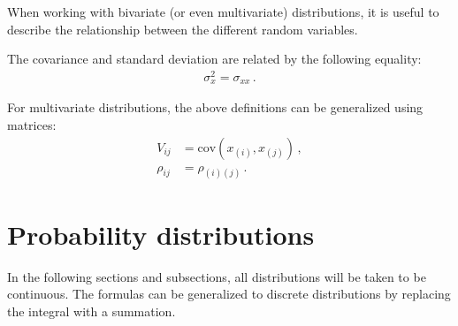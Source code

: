     When working with bivariate (or even multivariate) distributions, it is useful to describe the relationship between the different random variables.

    \begin{property}
        The covariance and standard deviation are related by the following equality:
        \begin{gather}
            \sigma_x^2 = \sigma_{xx}\,.
        \end{gather}
    \end{property}

    \begin{remark}
        For multivariate distributions, the above definitions can be generalized using matrices:
        \begin{align}
            \label{statistics:covariance_matrix}
            V_{ij} &= \mathrm{cov}(x_{(i)},x_{(j)})\,,\\
            \label{statistics:correlation_matrix}
            \rho_{ij} &= \rho_{(i)(j)}\,.
        \end{align}
    \end{remark}

\section{Probability distributions}

    In the following sections and subsections, all distributions will be taken to be continuous. The formulas can be generalized to discrete distributions by replacing the integral with a summation.

